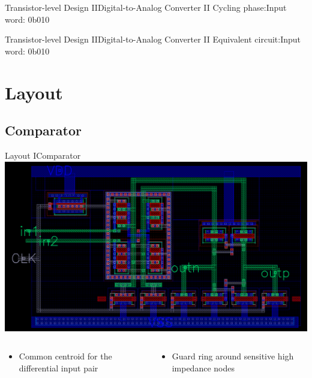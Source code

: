 \documentclass{beamer}
\begin{document}
 \begin{frame}{Transistor-level Design II}{Digital-to-Analog Converter II}
  Cycling phase:\hfill Input word: \alert{0b010}
  \vspace*{1em}
  \begin{center}
   
  \end{center}
 \end{frame}

 \begin{frame}{Transistor-level Design II}{Digital-to-Analog Converter II}
  Equivalent circuit:\hfill Input word: \alert{0b010}
  \vspace*{1em}
  \begin{center}
   
  \end{center}
 \end{frame}
 \section{Layout}
 \subsection{Comparator}
 \begin{frame}{Layout I}{Comparator}
  \includegraphics[width=\textwidth]{img/comparator_layout}

  \begin{columns}
   \begin{column}{0.5\textwidth}
    \begin{itemize}
     \item Common centroid for the differential input pair
    \end{itemize}
   \end{column}
   \begin{column}{0.5\textwidth}
    \begin{itemize}
     \item<2-> Guard ring around sensitive high impedance nodes
    \end{itemize}
   \end{column}
  \end{columns}
 \end{frame}
 
\end{document}
